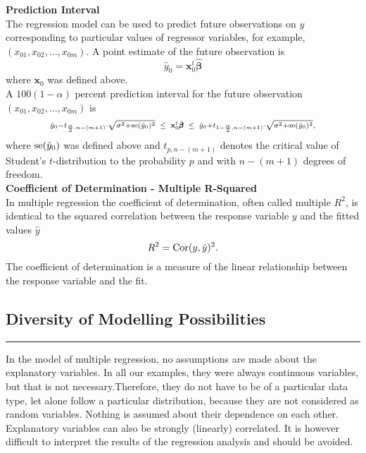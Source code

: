 \textbf{Prediction Interval}\\
The regression model can be used to predict future observations on $y$ corresponding to particular values of regressor variables, for example, $(x_{01}, x_{02}, . . . , x_{0m})$. A point estimate of the future observation is
\begin{equation}
  \hat{y}_0 = \mathbf{x}^t_0 \hat{\pmb{\beta}}
\end{equation}
where $\mathbf{x}_0$ was defined above.\\
A $100(1 - \alpha)$ percent prediction interval for the future observation $(x_{01}, x_{02}, . . . , x_{0m})$ is
\begin{equation} \scriptstyle
  \hat{y}_0 - t_{\frac{\alpha}{2},n-(m+1)} \cdot \sqrt{\sigma^2 + \textup{se}(\hat{y}_0)^2}
  \;\; \leq \;\; \mathbf{x}^t_0 \hat{\pmb{\beta}} \;\; \leq \;\;
  \hat{y}_0 + t_{1-{\frac{\alpha}{2},n-(m+1)}} \cdot \sqrt{\sigma^2 + \textup{se}(\hat{y}_0)^2},
\end{equation}
where $\textup{se}(\hat{y}_0)$ was defined above and $t_{p,n-(m+1)}$ denotes the critical value of Student’s $t$-distribution to the probability $p$ and with $n - (m + 1)$ degrees of freedom.\\

\textbf{Coefficient of Determination - Multiple R-Squared}\\
In multiple regression the coefficient of determination, often called multiple $R^2$, is identical to the squared correlation between the response variable $y$ and the fitted values $\hat{y}$
\begin{equation}
  R^2 = \textup{Cor}(y, \hat{y})^2.
\end{equation}
The coefficient of determination is a measure of the linear relationship between the response variable and the fit.

\subsection{Diversity of Modelling Possibilities}
\noindent\rule[\linienAbstand]{\linewidth}{\linienDicke}
In the model of multiple regression, no assumptions are made about the explanatory variables. In all our examples, they were always continuous variables, but that is not necessary.Therefore, they do not have to be of a particular data type, let alone follow a particular
distribution, because they are not considered as random variables. Nothing is assumed about
their dependence on each other.\\
Explanatory variables can also be strongly (linearly) correlated. It is however difficult to interpret the results of the regression analysis and should be avoided.\\


